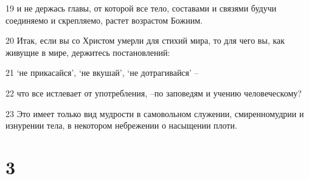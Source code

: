 \par 19 и не держась главы, от которой все тело, составами и связями будучи соединяемо и скрепляемо, растет возрастом Божиим.
\par 20 Итак, если вы со Христом умерли для стихий мира, то для чего вы, как живущие в мире, держитесь постановлений:
\par 21 `не прикасайся', `не вкушай', `не дотрагивайся' --
\par 22 что все истлевает от употребления, --по заповедям и учению человеческому?
\par 23 Это имеет только вид мудрости в самовольном служении, смиренномудрии и изнурении тела, в некотором небрежении о насыщении плоти.

\chapter{3}


